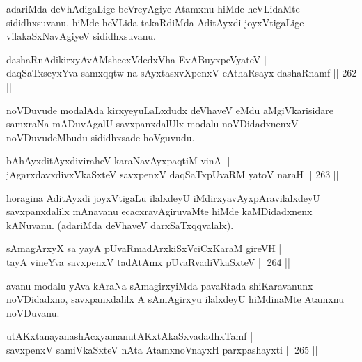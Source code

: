 \begin{artha}
adariMda deVhAdigaLige beVreyAgiye Atamxnu hiMde heVLidaMte sididhxsuvanu. hiMde heVLida takaRdiMda AditAyxdi joyxVtigaLige  vilakaSxNavAgiyeV sididhxsuvanu.
\end{artha}


\begin{shl}
dashaRnAdikirxyAvAMshecxVdedxVha EvABuyxpeVyateV | \\
daqSaTxseyxYva samxqqtw na sAyxtasxvXpenxV cAthaRsayx dashaRnamf \hfill ||  262 ||  
\end{shl}

\begin{artha}
noVDuvude modalAda kirxyeyuLaLxdudx deVhaveV eMdu aMgiVkarisidare samxraNa mADuvAgalU savxpanxdalUlx modalu noVDidadxnenxV noVDuvudeMbudu sididhxsade hoVguvudu.
\end{artha}

\begin{shl}
bAhAyxditAyxdiviraheV karaNavAyxpaqtiM vinA ||  \\
jAgarxdavxdivxVkaSxteV savxpenxV daqSaTxpUvaRM yatoV naraH \hfill ||  263 ||  
\end{shl}

\begin{artha}
horagina AditAyxdi joyxVtigaLu ilalxdeyU iMdirxyavAyxpAravilalxdeyU savxpanxdalilx mAnavanu ecacxravAgiruvaMte hiMde kaMDidadxnenx kANuvanu. (adariMda deVhaveV darxSaTxqqvalalx).
\end{artha}


\begin{shl}
sAmagArxyX sa yayA pUvaRmadArxkiSxVciCxKaraM gireVH | \\
tayA vineYva savxpenxV tadAtAmx pUvaRvadiVkaSxteV \hfill ||  264 || 
\end{shl}

\begin{artha}
avanu modalu yAva kAraNa sAmagirxyiMda pavaRtada shiKaravanunx noVDidadxno, savxpanxdalilx A sAmAgirxyu ilalxdeyU hiMdinaMte Atamxnu noVDuvanu.
\end{artha}


\begin{shl}
utAKxtanayanashAcxyamanutAKxtAkaSxvadadhxTamf | \\
savxpenxV samiVkaSxteV nAta AtamxnoV\s nayxH parxpashayxti \hfill ||  265 ||  
\end{shl}

